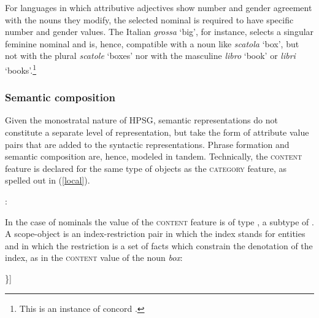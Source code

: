 \documentclass[output=paper
                ,modfonts
                ,nonflat
	        ,collection
	        ,collectionchapter
	        ,collectiontoclongg
 	        ,biblatex
                ,babelshorthands
                ,newtxmath
                ,draftmode
                ,colorlinks, citecolor=brown
]{./langsci/langscibook}
\begin{document}
For languages in which attributive adjectives show number and gender agreement 
with the nouns they modify, the selected nominal is required to have specific 
number and gender values. The Italian \emph{grossa} `big', for instance, 
selects a singular feminine nominal and is, hence, compatible with a noun like 
\emph{scatola} `box', but not with the plural \emph{scatole} `boxes' nor with 
the masculine \emph{libro} `book' or \emph{libri} `books'.\footnote{This is an 
instance of concord .}  


\subsubsection{Semantic composition}
\label{semco} 


Given the monostratal nature of HPSG, semantic representations 
do not constitute a separate level of representation, but take the form 
of attribute value pairs that are added to the syntactic representations.   
Phrase formation and semantic composition are, hence, modeled in tandem.  
Technically, the \textsc{content} feature is declared for the same type of objects 
as the \textsc{category} feature, as spelled out in (\ref{local}). 

\begin{exe} 
\ex\label{local}  : \begin{avm} 
                   \end{avm} 
\end{exe} 

\noindent 
In the case of nominals the value of the \textsc{content} feature is of 
type , a subtype of  \citep[122]{GS00}. 
A scope-object is an index-restriction pair in which the index stands for 
entities and in which the restriction is a set of facts which constrain the 
denotation of the index, as in the \textsc{content} value of the noun \emph{box}:    

\begin{exe} 
\ex\label{red} 
\begin{avm}
[\type{scope-object}   \\
 index & @1 \type{index} \\
 restr & \{[\type{box}   \\
            arg & @1 ]\}]
\end{avm} 
\end{exe}
\end{document}
